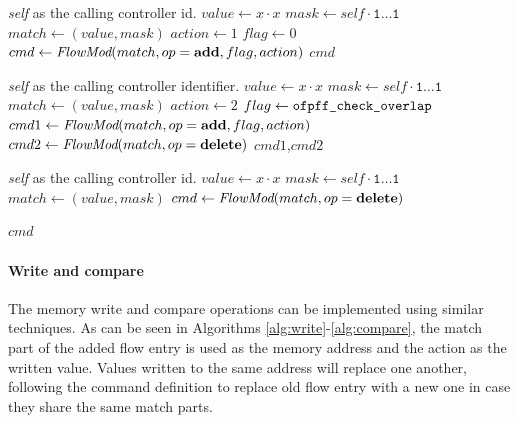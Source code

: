 \documentclass[conference]{sigcomm-alternate}
\newcommand{\concat}[0]{\cdot}
\newcommand{\claimcheck}{check\xspace}
\newcommand{\compare}{compare\xspace}
\newcommand{\memwrite}{write\xspace}
\newcommand{\add}{\textbf{add}\xspace}
\newcommand{\dele}{\textbf{delete}\xspace}
\newcommand{\checko}{\texttt{check\_overlap}\xspace}
\begin{document}
\begin{algorithm}[H]
    \caption{$\textit{claim}(x)$}
    \label{alg:claim}
    \begin{algorithmic}[1]
    \Require \emph{self} as the calling controller id.
    		\State $value \gets x\concat x$
    		\State $mask \gets self\concat \texttt{1$\ldots$1}$
	    	\State $match \gets (value,mask)$
    		\State $action \gets 1$
    		\State $flag \gets 0$
    		\State $cmd\gets \emph{FlowMod}(match, op = \add, flag, action) $
			\Return $cmd$
    \end{algorithmic}
\end{algorithm}

\begin{algorithm}[H]
    \caption{$\textit{\claimcheck}(x)$}
    \label{alg:check}
    \begin{algorithmic}[1]
    \Require \emph{self} as the calling controller identifier.
    		\State $value \gets x\concat x$
    		\State $mask \gets self\concat \texttt{1$\ldots$1}$
    		\State $match \gets (value,mask)$
    		\State $action \gets 2$
    		\State $flag \gets \texttt{ofpff\_\checko}$
    		\State $cmd1\gets \emph{FlowMod}(match, op = \add, flag, action) $
    		\State $cmd2\gets \emph{FlowMod}(match, op = \dele) $
			\Return $cmd1$,$cmd2$
    \end{algorithmic}
\end{algorithm}

\begin{algorithm}[H]
    \caption{$\textit{unclaim}(x)$}
    \label{alg:unclaim}
    \begin{algorithmic}[1]
    \Require \emph{self} as the calling controller id.
    		\State $value \gets x\concat x$
    		\State $mask \gets self\concat \texttt{1$\ldots$1}$
    		\State $match \gets (value,mask)$
    		\State $cmd\gets \emph{FlowMod}(match, op=\dele) $
    	
			
			\Return $cmd$
    \end{algorithmic}
\end{algorithm}

\paragraph{Write and compare}
The memory \memwrite and \compare
 operations can be implemented using similar techniques.
 As can be seen in Algorithms \ref{alg:write}-\ref{alg:compare},
  the match part of the added flow entry is used as the memory address and the action as
  the written value. Values written to the same address will replace one another,
following the command definition to replace old flow entry with a new one in case they
share the same match parts.
\end{document}
